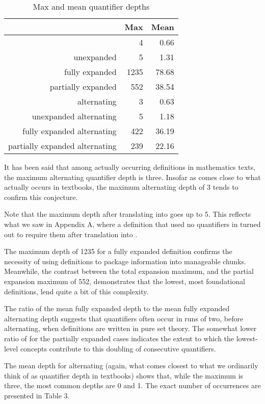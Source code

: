 \documentclass{llncs}
\begin{document}
\begin{table}
\label{qDepths}
\begin{center}
\caption{Max and mean quantifier depths}
\begin{tabular}{|r|r|r|}
\hline
 & Max & Mean \\\hline
 & 4 & 0.66 \\
unexpanded  & 5 & 1.31 \\
fully expanded  & 1235 & 78.68 \\
partially expanded  & 552 & 38.54 \\\hline
 alternating & 3 & 0.63 \\
unexpanded  alternating & 5 & 1.18 \\
fully expanded  alternating & 422 & 36.19 \\
partially expanded  alternating & 239 & 22.16 \\
\hline
\end{tabular}
\end{center}
\end{table}
It has been said that among actually occurring definitions in
mathematics texts, the maximum alternating quantifier depth is three.
Insofar as  comes close to what actually occurs in
textbooks, the maximum alternating depth of 3 tends to
confirm this conjecture.

Note that the maximum depth after translating into  goes up
to 5. This reflects what we saw in Appendix A, where a definition that
used no quantifiers in  turned out to require them after
translation into .

The maximum depth of 1235 for a fully expanded definition confirms the
necessity of using definitions to package information into manageable
chunks. Meanwhile, the contrast between the total expansion maximum,
and the partial expansion maximum of 552, demonstrates that the
lowest, most foundational definitions, lend quite a bit of this
complexity.

The ratio  of the mean fully expanded depth
to the mean fully expanded alternating depth suggests that quantifiers
often occur in runs of two, before alternating, when definitions are
written in pure set theory. The somewhat lower ratio of  for the partially expanded cases indicates the extent to
which the lowest-level concepts contribute to this doubling of
consecutive quantifiers.

The mean depth for  alternating (again, what comes closest
to what we ordinarily think of as quantifier depth in textbooks) shows
that, while the maximum is three, the most common depths are 0 and
1. The exact number of occurrences are presented in Table 3.
\end{document}
